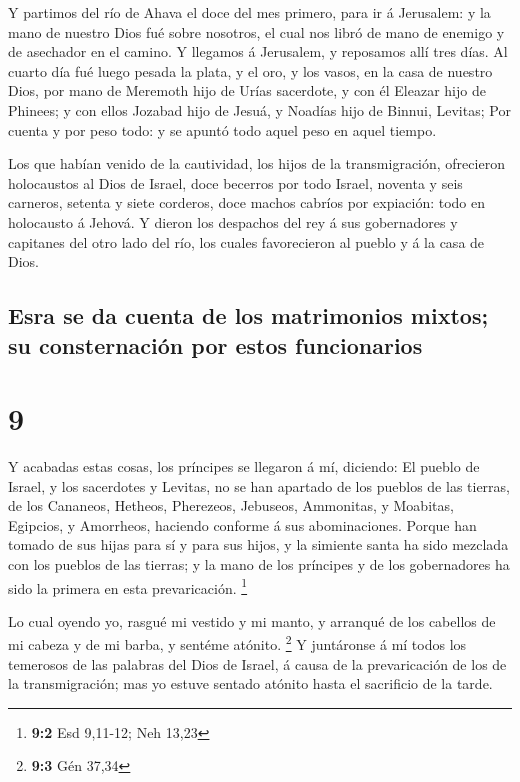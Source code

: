  Y partimos del río de Ahava el doce del mes primero, para
ir á Jerusalem: y la mano de nuestro Dios fué sobre nosotros, el cual
nos libró de mano de enemigo y de asechador en el camino. 
Y llegamos á Jerusalem, y reposamos allí tres días.  Al
cuarto día fué luego pesada la plata, y el oro, y los vasos, en la casa
de nuestro Dios, por mano de Meremoth hijo de Urías sacerdote, y con él
Eleazar hijo de Phinees; y con ellos Jozabad hijo de Jesuá, y Noadías
hijo de Binnui, Levitas;  Por cuenta y por peso todo: y se
apuntó todo aquel peso en aquel tiempo.

 Los que habían venido de la cautividad, los hijos de la
transmigración, ofrecieron holocaustos al Dios de Israel, doce becerros
por todo Israel, noventa y seis carneros, setenta y siete corderos, doce
machos cabríos por expiación: todo en holocausto á Jehová. 
Y dieron los despachos del rey á sus gobernadores y capitanes del otro
lado del río, los cuales favorecieron al pueblo y á la casa de Dios.

\hypertarget{esra-se-da-cuenta-de-los-matrimonios-mixtos-su-consternaciuxf3n-por-estos-funcionarios}{%
\subsection{Esra se da cuenta de los matrimonios mixtos; su
consternación por estos
funcionarios}\label{esra-se-da-cuenta-de-los-matrimonios-mixtos-su-consternaciuxf3n-por-estos-funcionarios}}

\hypertarget{section-8}{%
\section{9}\label{section-8}}

 Y acabadas estas cosas, los príncipes se llegaron á mí,
diciendo: El pueblo de Israel, y los sacerdotes y Levitas, no se han
apartado de los pueblos de las tierras, de los Cananeos, Hetheos,
Pherezeos, Jebuseos, Ammonitas, y Moabitas, Egipcios, y Amorrheos,
haciendo conforme á sus abominaciones.  Porque han tomado de
sus hijas para sí y para sus hijos, y la simiente santa ha sido mezclada
con los pueblos de las tierras; y la mano de los príncipes y de los
gobernadores ha sido la primera en esta prevaricación. \footnote{\textbf{9:2}
  Esd 9,11-12; Neh 13,23}

 Lo cual oyendo yo, rasgué mi vestido y mi manto, y arranqué
de los cabellos de mi cabeza y de mi barba, y sentéme atónito.
\footnote{\textbf{9:3} Gén 37,34}  Y juntáronse á mí todos
los temerosos de las palabras del Dios de Israel, á causa de la
prevaricación de los de la transmigración; mas yo estuve sentado atónito
hasta el sacrificio de la tarde.

